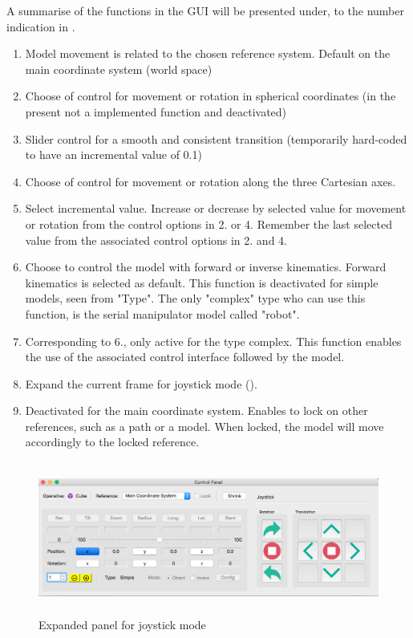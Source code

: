 A summarise of the functions in the GUI will be presented under, to the number indication in .
\begin{enumerate}
\item Model movement is related to the chosen reference system. Default on the main coordinate system (world space)
\item Choose of control for movement or rotation in spherical coordinates (in the present not a implemented function and deactivated)

\item Slider control for a smooth and consistent transition (temporarily hard-coded to have an incremental value of 0.1)

\item Choose of control for movement or rotation along the three Cartesian axes.

\item Select incremental value. Increase or decrease by selected value for movement or rotation from the control options in 2. or 4. Remember the last selected value from the associated control options in 2. and 4.

\item Choose to control the model with forward or inverse kinematics. Forward kinematics is selected as default. This function is deactivated for simple models, seen from "Type". The only "complex" type who can use this function, is the serial manipulator model called "robot".

\item Corresponding to 6., only active for the type complex. This function enables the use of the associated control interface followed by the model.

\item Expand the current frame for joystick mode ().

\item Deactivated for the main coordinate system. Enables to lock on other references, such as a path or a model. When locked, the model will move accordingly to the locked reference.
\end{enumerate}

\begin{figure}[ht]
    \centering
    \includegraphics[height=5cm]{images/Joystick.png}
    \caption[Expanded panel for joystick mode]{Expanded panel for joystick mode}
    \label{fig:joystick}
\end{figure}

